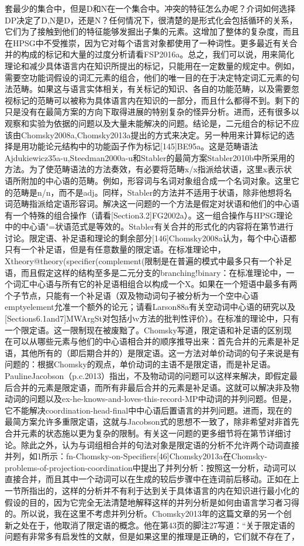 套最少的集合中，但是D和N在一个集合中。冲突的特征怎么办呢？介词如何选择DP决定了D,N是D，还是N？任何情况下，很清楚的是形式化会包括循环的关系，它们为了接触到他们的特征能够发掘出子集的元素。这增加了整体的复杂度，而且在HPSG中不受推崇，因为它对每个语言对象都使用了一种词性。更多最近有关合并的构成的标记和大量的过度分析请看FSP2016a。总之，我们可以说，用来简化理论和减少具体语言内在知识所提出的标记，只能用在一定数量的规定中。例如，需要空功能词假设的词汇元素的组合，他们的唯一目的在于决定特定词汇元素的句法范畴。如果这与语言实体相关，有关标记的知识、各自的功能范畴，以及需要忽视标记的范畴可以被称为具体语言内在知识的一部分，而且什么都得不到。剩下的只是没有在最简方案的方向下取得进展的特别复杂的怪异分析。进而，还有很多以观察和实验为依据的问题以及大量未能解决的问题。结论是，二元组合的标记不应该由Chomsky2008a,Chomsky2013a提出的方式来决定。另一种用来计算标记的选择是用功能论元结构中的功能函子作为标记[145]BE95a。这是范畴语法Ajdukiewicz35a-u,Steedman2000a-u和Stabler的最简方案Stabler2010b中所采用的方法。为了使范畴语法的方法奏效，有必要将范畴x/x指派给状语，这里x表示状语所附加的中心语的范畴。例如，形容词与名词对象组合成一个名词对象。这里它的范畴是n/n，而不是adj。同样，Stabler的方法并不适用于状语，除非他想将名词范畴指派给定语形容词。解决这一问题的一个方法是假定对状语和他们的中心语有一个特殊的组合操作（请看[Section3.2]FG2002a）。这一组合操作与HPSG理论中的中心语"=状语范式是等效的。Stabler有关合并的形式化的内容将在第节进行讨论。限定语、补足语和理论的剩余部分[146]Chomsky2008a认为，每个中心语都只有一个补足语，但是有任意数量的限定语。在标准理论中，Xtheory@theory(specifier(complement(限制是在普遍的模式中最多只有一个补足语，而且假定这样的结构至多是二元分支的branching!binary：在标准理论中，一个词汇中心语与所有它的补足语相组合以构成一个X。如果在一个短语中最多有两个子节点，只能有一个补足语（双及物动词句子被分析为一个空中心语emptyelement允准一个额外的论元；请看Larson88a有关空动词中心语的研究以及[Sections6.1and7]MWArgSt对包括小v方法的批判性评价）。在标准的理论中，只有一个限定语。这一限制现在被废黜了。Chomsky写道，限定语和补足语的区别现在可以从哪些元素与他们的中心语相合并的顺序推导出来：首先合并的元素是补足语，其他所有的（即后期合并的）是限定语。这一方法对单价动词的句子来说是有问题的：根据Chomsky的观点，单价动词的主语不是限定语，而是补足语。PaulineJacobson（p.c.2013）指出，不及物动词的问题可以这样来解决，即假定最后合并的元素是限定语，而所有非最后合并的元素是补足语。这就可以解决非及物动词的问题以及ex-he-knows-and-loves-this-record-MP中动词的并列问题。但是，它不能解决coordination-head-final中中心语后置语言的并列问题。进而，现在的最简方案允许多重限定语，这就与Jacobson式的思想不一致了，除非希望对非首先合并元素的状态施以更为复杂的限制。有关这一问题的更多细节将在第节详细讨论。除此之外，认为与词组相合并的句法对象是限定语的分析不允许两个动词直接并列，如1所示：fn-Chomsky-on-Specifiers[46]Chomsky2013a在Chomsky-problems-of-projection-coordination中提出了并列分析：按照这一分析，动词可以直接合并，而且其中一个动词可以在生成的较后步骤中在连词前后移动。正如在上一节所指出的，这样的分析并不有利于达到关于具体语言的内在知识进行最小化的假设的目的，因为它完全无法清楚地解释这样的并列分析是如何由语言学习者习得的。所以说，我在这里不考虑并列分析。Chomsky2013年的这篇文章的另一个创新之处在于，他取消了限定语的概念。他在第43页的脚注27写道：“关于限定语的问题有非常多有启发性的文献，但是如果这里的推理是正确的，它们就不存在了，